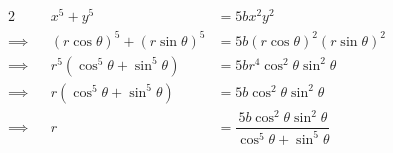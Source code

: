\documentclass{jhwhw}
\begin{document}
    \solution
        \begin{alignat*}{2}
            &&x^5 + y^5 &= 5bx^2y^2\\
            \implies&&(r\cos \theta)^5 + (r\sin\theta)^5 &= 5b(r\cos\theta)^2(r\sin\theta)^2\\
            \implies&&r^5\left(\cos^5\theta + \sin^5\theta\right) &= 5br^4\cos^2\theta\sin^2\theta\\
            \implies&&r\left(\cos^5\theta + \sin^5\theta\right) &= 5b\cos^2\theta\sin^2\theta\\
            \implies&&r &= \dfrac{5b\cos^2\theta\sin^2\theta}{\cos^5\theta + \sin^5\theta}
        \end{alignat*}

\end{document}
